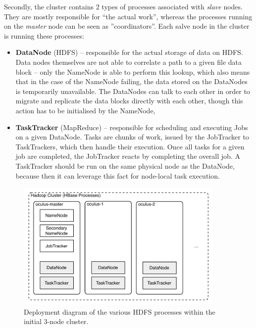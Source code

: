 Secondly, the cluster contains 2 types of processes associated with \textit{slave} nodes. They are mostly responsible for ``the actual work'', whereas the processes running on the \textit{master} node can be seen as ''coordinators''. Each salve node in the cluster is running these processes:

\begin{itemize}
  \item \textbf{DataNode} (HDFS) -- responsible for the actual storage of data on HDFS. Data nodes themselves are not able 
                                    to correlate a path to a given file data block -- only the NameNode is able to 
                                    perform this lookup, which also means that in the case of the NameNode failing,
                                    the data stored on the DataNodes is temporarily unavailable. The DataNodes can talk 
                                    to each other in order to migrate and replicate the data blocks directly with each
                                    other, though this action has to be initialised by the NameNode,
  
  \item \textbf{TaskTracker} (MapReduce) -- responsible for scheduling and executing Jobs on a given DataNode. Tasks are
                                            chunks of work, issued by the JobTracker to TaskTrackers, which then handle
                                            their execution. Once all tasks for a given job are completed, the JobTracker 
                                            reacts by completing the overall job. A TaskTracker should be run on the same
                                            physical node as the DataNode, because then it can leverage this fact for
                                            node-local task execution.
\end{itemize}


\begin{figure}[ch!]
  \centering
  \includegraphics[width=0.90\textwidth]{img/hdfs-processes}
  \caption{Deployment diagram of the various HDFS processes within the initial 3-node cluster.}
  \label{fig:small-cluster-deployment}
\end{figure}

